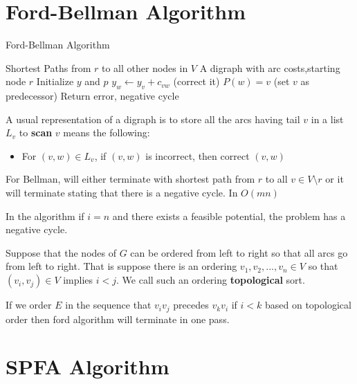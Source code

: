			\section{Ford-Bellman Algorithm}
				\begin{algorithm}
					\caption{Ford-Bellman Algorithm}
					\begin{algorithmic}
						\Ensure Shortest Paths from $r$ to all other nodes in $V$
						\Require A digraph with arc costs,starting node $r$
						\State Initialize $y$ and $p$
									\State $y_w \gets y_v + c_{vw}$ (correct it)
									\State $P(w) = v$ (set $v$ as predecessor)
								\EndIf
							\EndFor
						\EndFor
								\State Return error, negative cycle
							\EndIf
						\EndFor
					\end{algorithmic}
				\end{algorithm}

				A usual representation of a digraph is to store all the arcs having tail $v$ in a list $L_v$ to \textbf{scan} $v$ means the following:
				\begin{itemize}
					\item For $(v, w) \in L_v$, if $(v, w)$ is incorrect, then correct $(v, w)$
				\end{itemize}

				For Bellman, will either terminate with shortest path from $r$ to all $v\in V\setminus r$ or it will terminate stating that there is a negative cycle. In $O(mn)$

				In the algorithm if $i = n$ and there exists a feasible potential, the problem has a negative cycle.

				Suppose that the nodes of $G$ can be ordered from left to right so that all arcs go from left to right. That is suppose there is an ordering $v_1, v_2, ..., v_n \in V$ so that $(v_i, v_j) \in V$ implies $i < j$. We call such an ordering \textbf{topological} sort.

				If we order $E$ in the sequence that $v_iv_j$ precedes $v_kv_i$ if $i<k$ based on topological order then ford algorithm will terminate in one pass.

			\section{SPFA Algorithm}

